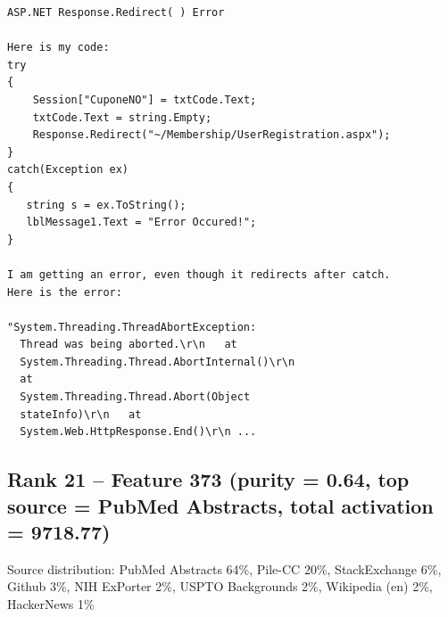 \begin{verbatim}
ASP.NET Response.Redirect( ) Error

Here is my code:
try
{
    Session["CuponeNO"] = txtCode.Text;
    txtCode.Text = string.Empty;
    Response.Redirect("~/Membership/UserRegistration.aspx");
}
catch(Exception ex)
{
   string s = ex.ToString();
   lblMessage1.Text = "Error Occured!";
}

I am getting an error, even though it redirects after catch.
Here is the error:

"System.Threading.ThreadAbortException:
  Thread was being aborted.\r\n   at
  System.Threading.Thread.AbortInternal()\r\n
  at
  System.Threading.Thread.Abort(Object
  stateInfo)\r\n   at
  System.Web.HttpResponse.End()\r\n ...

\end{verbatim}

\subsection*{Rank 21 -- Feature 373 (purity = 0.64, top source = PubMed Abstracts, total activation = 9718.77)}

Source distribution: PubMed Abstracts 64\%, Pile-CC 20\%, StackExchange 6\%, Github 3\%, NIH ExPorter 2\%, USPTO Backgrounds 2\%, Wikipedia (en) 2\%, HackerNews 1\%

